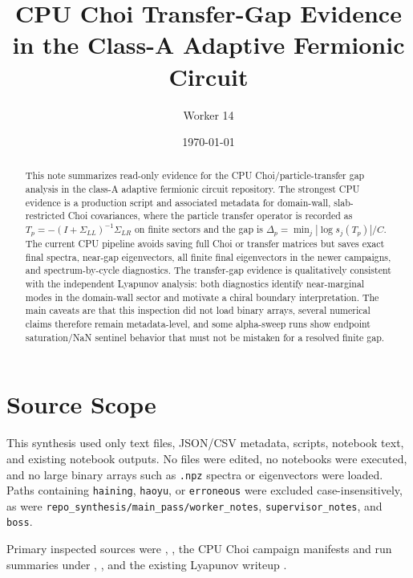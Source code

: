 \documentclass[aps,prb,onecolumn,nofootinbib,superscriptaddress]{revtex4-2}
\begin{document}
\title{CPU Choi Transfer-Gap Evidence in the Class-A Adaptive Fermionic Circuit}
\author{Worker 14}
\date{\today}

\begin{abstract}
This note summarizes read-only evidence for the CPU Choi/particle-transfer gap
analysis in the class-A adaptive fermionic circuit repository.  The strongest
CPU evidence is a production script and associated metadata for
domain-wall, slab-restricted Choi covariances, where the particle transfer
operator is recorded as
$T_p=-(I+\Sigma_{LL})^{-1}\Sigma_{LR}$ on finite sectors and the gap is
$\Delta_p=\min_j|\log s_j(T_p)|/C$.  The current CPU pipeline avoids saving full
Choi or transfer matrices but saves exact final spectra, near-gap eigenvectors,
all finite final eigenvectors in the newer campaigns, and spectrum-by-cycle
diagnostics.  The transfer-gap evidence is qualitatively consistent with the
independent Lyapunov analysis: both diagnostics identify near-marginal modes in
the domain-wall sector and motivate a chiral boundary interpretation.  The main
caveats are that this inspection did not load binary arrays, several numerical
claims therefore remain metadata-level, and some alpha-sweep runs show endpoint
saturation/NaN sentinel behavior that must not be mistaken for a resolved
finite gap.
\end{abstract}

\maketitle
\setcounter{tocdepth}{2}
\tableofcontents

\section{Source Scope}

This synthesis used only text files, JSON/CSV metadata, scripts, notebook text,
and existing notebook outputs.  No files were edited, no notebooks were
executed, and no large binary arrays such as \texttt{.npz} spectra or
eigenvectors were loaded.  Paths containing \texttt{haining}, \texttt{haoyu}, or
\texttt{erroneous} were excluded case-insensitively, as were
\texttt{repo\_synthesis/main\_pass/worker\_notes},
\texttt{supervisor\_notes}, and \texttt{boss}.

Primary inspected sources were ,
, the CPU Choi
campaign manifests and run summaries under
,
, and the existing Lyapunov writeup
.
\end{document}
